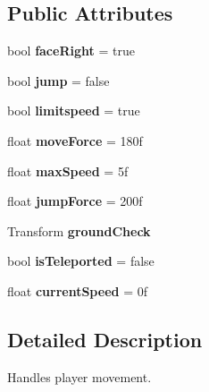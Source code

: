 \subsection*{Public Attributes}
\begin{DoxyCompactItemize}
\item 
\mbox{\label{class_player_movement_aa83a2390fe399c816eac24ac74a02528}} 
bool {\bfseries face\+Right} = true
\item 
\mbox{\label{class_player_movement_aaf3e5c59c7392a57747a6a189c29febe}} 
bool {\bfseries jump} = false
\item 
\mbox{\label{class_player_movement_ab7e65d7d22d470d72161af29b4557880}} 
bool {\bfseries limitspeed} = true
\item 
\mbox{\label{class_player_movement_a411dc41a76270f4ff0ea15e0b996b8ed}} 
float {\bfseries move\+Force} = 180f
\item 
\mbox{\label{class_player_movement_a18b9bde59ef4f50acf685694f67ee3c7}} 
float {\bfseries max\+Speed} = 5f
\item 
\mbox{\label{class_player_movement_a2918af247f8fd93a1dfe84b8d997c280}} 
float {\bfseries jump\+Force} = 200f
\item 
\mbox{\label{class_player_movement_a681e7b28ce40d859bbe21c231a676ce8}} 
Transform {\bfseries ground\+Check}
\item 
\mbox{\label{class_player_movement_a48a8923fa5137614141dd6886257af61}} 
bool {\bfseries is\+Teleported} = false
\item 
\mbox{\label{class_player_movement_aaa09d728d8c810da1e4b571eaad8686f}} 
float {\bfseries current\+Speed} = 0f
\end{DoxyCompactItemize}


\subsection{Detailed Description}
Handles player movement. 

